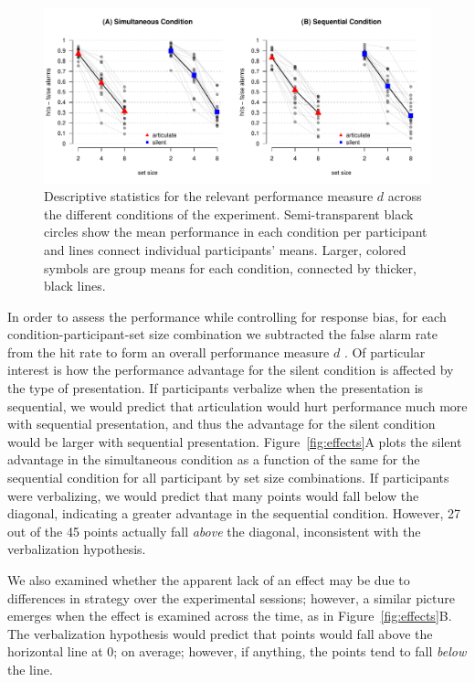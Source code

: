 \begin{figure}[t]
 	\centering
	\includegraphics[width=\textwidth]{figures/descriptiveStats}
	\caption{Descriptive statistics for the relevant performance measure $d$ across the different conditions of the experiment. Semi-transparent black circles show the mean performance in each condition per participant and lines connect individual participants' means. Larger, colored symbols are group means for each condition, connected by thicker, black lines.}

	\label{fig:descriptiveStats}
\end{figure}


In order to assess the performance while controlling for response bias, for each condition-participant-set size combination we subtracted the false alarm rate from the hit rate to form an overall performance measure $d$ \citep{Cowan:etal:2005,Rouder:etal:2011}. Of particular interest is how the performance advantage for the silent condition is affected by the type of presentation. If participants verbalize when the presentation is sequential, we would predict that articulation would hurt performance much more with sequential presentation, and thus the advantage for the silent condition would be larger with sequential presentation. Figure~\ref{fig:effects}A plots the silent advantage in the simultaneous condition as a function of the same for the sequential condition for all participant by set size combinations. If participants were verbalizing, we would predict that many points would fall below the diagonal, indicating a greater advantage in the sequential condition. However, 27 out of the 45 points actually fall {\em above} the diagonal, inconsistent with the verbalization hypothesis. 

We also examined whether the apparent lack of an effect may be due to differences in strategy over the experimental sessions; however, a similar picture emerges when the effect is examined across the time, as in Figure~\ref{fig:effects}B. The verbalization hypothesis would predict that points would fall above the horizontal line at 0; on average; however, if anything, the points tend to fall {\em below} the line.

